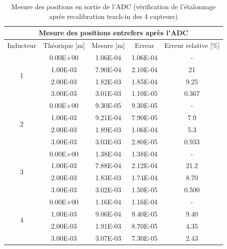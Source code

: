 \begin{table}[H]
    \centering
    \begin{tabular}{|c|c|c|c|c|}
        \hline
        \multicolumn{5}{|c|}{\textbf{Mesure des positions entrefers après l'ADC}}                     \\ \hline
        Inducteur          & Théorique {[}m{]} & Mesure {[}m{]} & Erreur   & Erreur relative {[}\%{]} \\ \hline
        \multirow{4}{*}{1} & 0.00E+00          & 1.06E-04       & 1.06E-04 & -                        \\ \cline{2-5}
                           & 1.00E-03          & 7.90E-04       & 2.10E-04 & 21                       \\ \cline{2-5}
                           & 2.00E-03          & 1.82E-03       & 1.85E-04 & 9.25                     \\ \cline{2-5}
                           & 3.00E-03          & 3.01E-03       & 1.10E-05 & 0.367                    \\ \hline
        \multirow{4}{*}{2} & 0.00E+00          & 9.30E-05       & 9.30E-05 & -                        \\ \cline{2-5}
                           & 1.00E-03          & 9.21E-04       & 7.90E-05 & 7.9                      \\ \cline{2-5}
                           & 2.00E-03          & 1.89E-03       & 1.06E-04 & 5.3                      \\ \cline{2-5}
                           & 3.00E-03          & 3.03E-03       & 2.80E-05 & 0.933                    \\ \hline
        \multirow{4}{*}{3} & 0.00E+00          & 1.38E-04       & 1.38E-04 & -                        \\ \cline{2-5}
                           & 1.00E-03          & 7.88E-04       & 2.12E-04 & 21.2                     \\ \cline{2-5}
                           & 2.00E-03          & 1.83E-03       & 1.74E-04 & 8.70                     \\ \cline{2-5}
                           & 3.00E-03          & 3.02E-03       & 1.50E-05 & 0.500                    \\ \hline
        \multirow{4}{*}{4} & 0.00E+00          & 1.16E-04       & 1.16E-04 & -                        \\ \cline{2-5}
                           & 1.00E-03          & 9.06E-04       & 9.40E-05 & 9.40                     \\ \cline{2-5}
                           & 2.00E-03          & 1.91E-03       & 8.70E-05 & 4.35                     \\ \cline{2-5}
                           & 3.00E-03          & 3.07E-03       & 7.30E-05 & 2.43                     \\ \hline
    \end{tabular}
    \caption{Mesure des positions en sortie de l'ADC (vérification de l'étalonnage après recalibration teach-in des 4 capteurs)}
    \label{tab:verif_etalonnage_teachin_adc}
\end{table}

